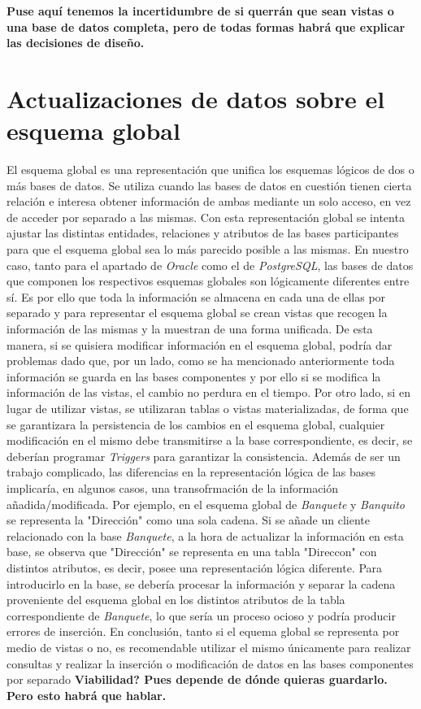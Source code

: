 \documentclass{article}
\begin{document}
\textbf{Puse aquí tenemos la incertidumbre de si querrán que sean vistas o una base de datos completa, pero de todas formas habrá que explicar las decisiones de diseño.}

\section{Actualizaciones de datos sobre el esquema global}
El esquema global es una representación que unifica los esquemas lógicos de dos o más bases de datos. Se utiliza cuando las bases de datos en cuestión tienen cierta relación e interesa obtener información de ambas mediante un solo acceso, en vez de acceder por separado a las mismas. Con esta representación global se intenta ajustar las distintas entidades, relaciones y atributos de las bases participantes para que el esquema global sea lo más parecido posible a las mismas. 
En nuestro caso, tanto para el apartado de \textit{Oracle} como el de \textit{PostgreSQL}, las bases de datos que componen los respectivos esquemas globales son lógicamente diferentes entre sí. Es por ello que toda la información se almacena en cada una de ellas por separado y para representar el esquema global se crean vistas que recogen la información de las mismas y la  muestran de una forma unificada. De esta manera, si se quisiera modificar información en el esquema global, podría dar problemas dado que, por un lado, como se ha mencionado anteriormente toda información se guarda en las bases componentes y por ello si se modifica la información de las vistas, el cambio no perdura en el tiempo. Por otro lado, si en lugar de utilizar vistas, se utilizaran tablas o vistas materializadas, de forma que se garantizara la persistencia de los cambios en el esquema global, cualquier modificación en el mismo debe transmitirse a la base correspondiente, es decir, se deberían programar \textit{Triggers} para garantizar la consistencia. Además de ser un trabajo complicado, las diferencias en la representación lógica de las bases implicaría, en algunos casos, una transofrmación de la información añadida/modificada. Por ejemplo, en el esquema global de \textit{Banquete} y \textit{Banquito} se representa la "Dirección" como una sola cadena. Si se añade un cliente relacionado con la base \textit{Banquete}, a la hora de actualizar la información en esta base, se observa que "Dirección" se representa en una tabla "Direccon" con distintos atributos, es decir, posee una representación lógica diferente. Para introducirlo en la base, se debería procesar la información y separar la cadena proveniente del esquema global en los distintos atributos de la tabla correspondiente de \textit{Banquete}, lo que sería un proceso ocioso y podría producir errores de inserción. 
En conclusión, tanto si el equema global se representa por medio de vistas o no, es recomendable utilizar el mismo únicamente para realizar consultas y realizar la inserción o modificación de datos en las bases componentes por separado 
\textbf{Viabilidad? Pues depende de dónde quieras guardarlo. Pero esto habrá que hablar.}\\
\\
\newpage
\end{document}
